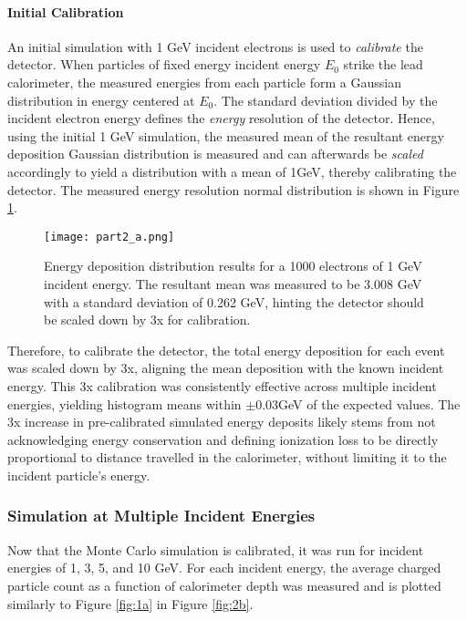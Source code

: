 \documentclass[twocolumn]{aastex631}
\begin{document}
\paragraph{Initial Calibration} An initial simulation with 1 GeV incident
electrons is used to \textit{calibrate} the detector. When particles of fixed
energy incident energy $E_0$ strike the lead calorimeter, the measured energies from
each particle form a Gaussian distribution in energy centered at $E_0$. The
standard deviation divided by the incident electron energy defines the \textit{energy}
resolution of the detector. Hence, using the initial 1 GeV simulation, the
measured mean of the resultant energy deposition Gaussian distribution is
measured and can afterwards be \textit{scaled} accordingly to yield a
distribution with a mean of 1GeV, thereby calibrating the detector. The measured 
energy resolution normal distribution is shown in Figure \ref{fig:2a}. 

\begin{figure}[htp]
  \centering
    \texttt{[image: part2\_a.png]}
    \caption{Energy deposition distribution results for a 1000 electrons of 1 GeV
        incident energy. The resultant mean was measured to be 3.008 GeV with a
        standard deviation of 0.262 GeV, hinting the detector should be scaled down by 3x
    for calibration.} 
    \label{fig:2a}
\end{figure}

Therefore, to calibrate the detector, the total energy deposition for each event
was scaled down by 3x, aligning the mean deposition with the known incident
energy. This 3x calibration was consistently effective across multiple incident
energies, yielding histogram means within $\pm 0.03$GeV of the expected values.
The 3x increase in pre-calibrated simulated energy deposits likely stems from
not acknowledging energy conservation and defining ionization loss to be
directly proportional to distance travelled in the calorimeter, without limiting
it to the incident particle's energy. 

\subsubsection{Simulation at Multiple Incident Energies} 

Now that the Monte Carlo simulation is calibrated, it was run for incident
energies of 1, 3, 5, and 10 GeV. For each incident energy, the average charged
particle count as a function of calorimeter depth was measured and is plotted
similarly to Figure \ref{fig:1a} in Figure \ref{fig:2b}. 
\end{document}
